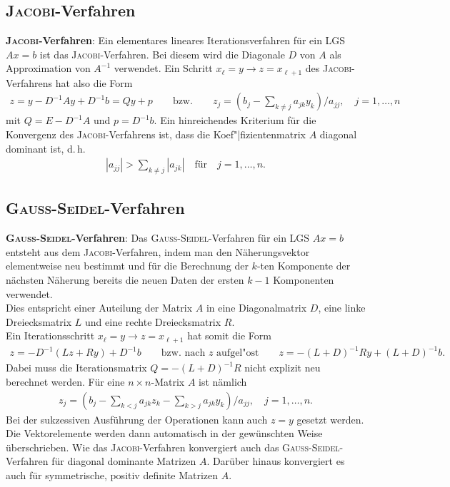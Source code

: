 \subsection{%
    \textsc{Jacobi}-Verfahren%
}

\textbf{\textsc{Jacobi}-Verfahren}:
Ein elementares lineares Iterationsverfahren für ein LGS $Ax = b$ ist
das \textsc{Jacobi}-Verfahren.
Bei diesem wird die Diagonale $D$ von $A$ als Approximation von $A^{-1}$
verwendet.
Ein Schritt $x_\ell = y \rightarrow z = x_{\ell+1}$ des
\textsc{Jacobi}-Verfahrens hat also die Form
\begin{align*}
    z = y - D^{-1}Ay + D^{-1}b = Qy + p \qquad\text{bzw.}\qquad
    z_j = \left(b_j - \sum_{k\not=j} a_{jk}y_k\right) / a_{jj}, \quad
    j = 1, \dotsc, n
\end{align*}
mit $Q = E - D^{-1}A$ und $p = D^{-1}b$.
Ein hinreichendes Kriterium für die Konvergenz des \textsc{Jacobi}-Verfahrens
ist, dass die Koef"|fizientenmatrix $A$ diagonal dominant ist, d.\,h.
\begin{align*}
    |a_{jj}| > \sum_{k\not=j} |a_{jk}| \quad \text{für} \quad j= 1, \dotsc, n.
\end{align*}

\subsection{%
    \textsc{Gauß}-\textsc{Seidel}-Verfahren%
}

\textbf{\textsc{Gauß}-\textsc{Seidel}-Verfahren}:
Das \textsc{Gauß}-\textsc{Seidel}-Verfahren für ein LGS $Ax = b$ entsteht
aus dem \textsc{Jacobi}-Verfahren, indem man den Näherungsvektor elementweise
neu bestimmt und für die Berechnung der $k$-ten Komponente der nächsten
Näherung bereits die neuen Daten der ersten $k - 1$ Komponenten verwendet. \\
Dies entspricht einer Auteilung der Matrix $A$ in eine Diagonalmatrix $D$,
eine linke Dreiecksmatrix $L$ und eine rechte Dreiecksmatrix $R$. \\
Ein Iterationsschritt $x_\ell = y \rightarrow z = x_{\ell+1}$ hat somit die
Form
\begin{align*}
    z = -D^{-1}(Lz + Ry) + D^{-1}b \qquad\text{bzw. nach } z
    \text{ aufgel"ost}\qquad
    z = -(L + D)^{-1}Ry + (L + D)^{-1}b.
\end{align*}
Dabei muss die Iterationsmatrix $Q = -(L + D)^{-1}R$ nicht explizit neu
berechnet werden.
Für eine $n \times n$-Matrix $A$ ist nämlich
\begin{align*}
    z_j = \left(b_j - \sum_{k<j} a_{jk}z_k - \sum_{k>j} a_{jk}y_k\right)
    / a_{jj}, \quad j= 1, \dotsc, n.
\end{align*}
Bei der sukzessiven Ausführung der Operationen kann auch $z = y$ gesetzt
werden.
Die Vektorelemente werden dann automatisch in der gewünschten Weise
überschrieben.
Wie das \textsc{Jacobi}-Verfahren konvergiert auch das
\textsc{Gauß}-\textsc{Seidel}-Verfahren für diagonal dominante Matrizen $A$.
Darüber hinaus konvergiert es auch für symmetrische, positiv definite
Matrizen $A$.

